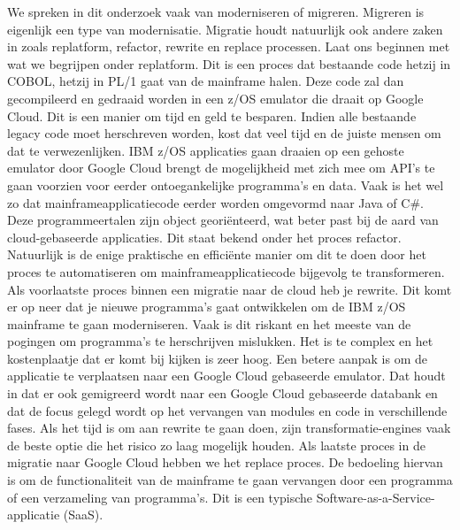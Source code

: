 We spreken in dit onderzoek vaak van moderniseren of migreren. Migreren is eigenlijk een type van modernisatie. Migratie houdt natuurlijk ook andere zaken in zoals replatform, refactor, rewrite en replace processen. Laat ons beginnen met wat we begrijpen onder replatform. Dit is een proces dat bestaande code hetzij in COBOL, hetzij in PL/1 gaat van de mainframe halen. Deze code zal dan gecompileerd en gedraaid worden in een z/OS emulator die draait op Google Cloud. Dit is een manier om tijd en geld te besparen. Indien alle bestaande legacy code moet herschreven worden, kost dat veel tijd en de juiste mensen om dat te verwezenlijken. IBM z/OS applicaties gaan draaien op een gehoste emulator door Google Cloud brengt de mogelijkheid met zich mee om API's te gaan voorzien voor eerder ontoegankelijke programma's en data. Vaak is het wel zo dat mainframeapplicatiecode eerder worden omgevormd naar Java of C\#. Deze programmeertalen zijn object georiënteerd, wat beter past bij de aard van cloud-gebaseerde applicaties. Dit staat bekend onder het proces refactor. Natuurlijk is de enige praktische en efficiënte manier om dit te doen door het proces te automatiseren om mainframeapplicatiecode bijgevolg te transformeren. Als voorlaatste proces binnen een migratie naar de cloud heb je rewrite. Dit komt er op neer dat je nieuwe programma's gaat ontwikkelen om de IBM z/OS mainframe te gaan moderniseren. Vaak is dit riskant en het meeste van de pogingen om programma's te herschrijven mislukken. Het is te complex en het kostenplaatje dat er komt bij kijken is zeer hoog. Een betere aanpak is om de applicatie te verplaatsen naar een Google Cloud gebaseerde emulator. Dat houdt in dat er ook gemigreerd wordt naar een Google Cloud gebaseerde databank en dat de focus gelegd wordt op het vervangen van modules en code in verschillende fases. Als het tijd is om aan rewrite te gaan doen, zijn transformatie-engines vaak de beste optie die het risico zo laag mogelijk houden. Als laatste proces in de migratie naar Google Cloud hebben we het replace proces. De bedoeling hiervan is om de functionaliteit van de mainframe  te gaan vervangen door een programma of een verzameling van programma's. Dit is een typische Software-as-a-Service-applicatie (SaaS). 

\subsection{}
\label{sec:De uitdagingen van mainframemodernisatie volgens Astadia}

